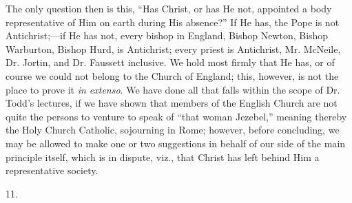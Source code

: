 The only question then is this, ``Has Christ, or has He not,
appointed a body representative of Him on earth during His
absence?'' If He has, the Pope is not Antichrist;—if He has not,
every bishop in England, Bishop Newton, Bishop Warburton, Bishop Hurd,
is Antichrist; every priest is Antichrist, Mr. McNeile, Dr. Jortin,
and Dr. Faussett inclusive. We hold most firmly that He has, or of
course we could not belong to the Church of England; this, however, is
not the place to prove it \emph{in extenso}. We have done all that
falls within the scope of Dr. Todd's lectures, if we have shown that
members of the English Church are not quite the persons to
venture to speak of ``that woman Jezebel,'' meaning thereby
the Holy Church Catholic, sojourning in Rome; however, before
concluding, we may be allowed to make one or two suggestions in behalf
of our side of the main principle itself, which is in dispute, viz.,
that Christ has left behind Him a representative society.

11.

